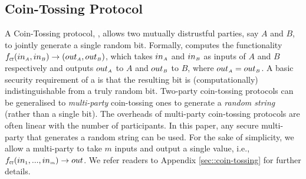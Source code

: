 


\vspace{-3.6mm}



\subsection{Coin-Tossing Protocol}\label{sec::short-coin-tossing}
\vspace{-1.2mm}

A Coin-Tossing protocol, \ct, allows two mutually distrustful parties, say $A$ and $B$, to jointly generate a single random bit. Formally, \ct computes the functionality $f_{\scriptscriptstyle \mathtt{CT}}(in_{\scriptscriptstyle A}, in_{\scriptscriptstyle B})\rightarrow (out_{\scriptscriptstyle A}, out_{\scriptscriptstyle B})$, which takes $in_{\scriptscriptstyle A}$ and  $in_{\scriptscriptstyle B}$ as inputs of $A$ and $B$ respectively and outputs $out_{\scriptscriptstyle A}$ to $A$ and $out_{\scriptscriptstyle B}$ to $B$, where $out_{\scriptscriptstyle A}=out_{\scriptscriptstyle B}$. A basic security requirement of a \ct is that the resulting bit is (computationally) indistinguishable from a truly random bit. 
%
Two-party coin-tossing protocols can be generalised to \emph{multi-party} coin-tossing ones to generate a \emph{random string} (rather than a single bit). 
%
The overheads of multi-party coin-tossing protocols are often linear with the number of participants. In this paper, any secure multi-party \ct that generates a random string can be used. For the sake of simplicity, we allow a multi-party \fct to take $m$ inputs and output a single value, i.e., $f_{\scriptscriptstyle \mathtt{CT}}(in_{\scriptscriptstyle 1}, ..., in_{\scriptscriptstyle m})\rightarrow out$. We refer readers to Appendix \ref{sec::coin-tossing} for further details. 

 


